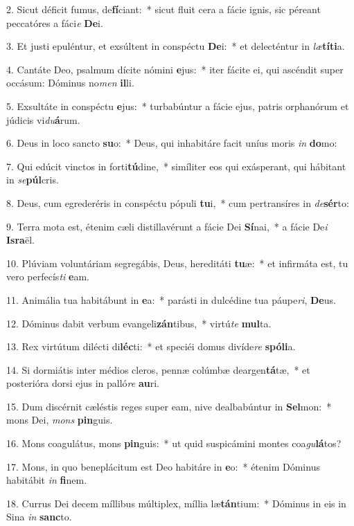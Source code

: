 2. Sicut déficit fumus, de\textbf{fí}ciant:~*  sicut fluit cera a fácie ignis, sic péreant peccatóres a fáci\textit{e} \textbf{De}i.\

3. Et justi epuléntur, et exsúltent in conspéctu \textbf{De}i:~*  et delecténtur in \textit{læ}\textbf{tí}\textbf{ti}a.\

4. Cantáte Deo, psalmum dícite nómini \textbf{e}jus:~*  iter fácite ei, qui ascéndit super occásum: Dóminus no\textit{men} \textbf{il}li.\

5. Exsultáte in conspéctu \textbf{e}jus:~*  turbabúntur a fácie ejus, patris orphanórum et júdicis vi\textit{du}\textbf{á}rum.\

6. Deus in loco sancto \textbf{su}o:~*  Deus, qui inhabitáre facit uníus moris \textit{in} \textbf{do}mo:\

7. Qui edúcit vinctos in forti\textbf{tú}dine,~*  simíliter eos qui exásperant, qui hábitant in \textit{se}\textbf{púl}cris.\

8. Deus, cum egrederéris in conspéctu pópuli \textbf{tu}i,~*  cum pertransíres in \textit{de}\textbf{sér}to:\

9. Terra mota est, étenim cæli distillavérunt a fácie Dei \textbf{Sí}nai,~*  a fácie De\textit{i} \textbf{Is}\textbf{ra}ël.\

10. Plúviam voluntáriam segregábis, Deus, hereditáti \textbf{tu}æ:~*  et infirmáta est, tu vero perfecís\textit{ti} \textbf{e}am.\

11. Animália tua habitábunt in \textbf{e}a:~*  parásti in dulcédine tua páupe\textit{ri}, \textbf{De}us.\

12. Dóminus dabit verbum evangeli\textbf{zán}tibus,~*  virtú\textit{te} \textbf{mul}ta.\

13. Rex virtútum dilécti di\textbf{léc}ti:~*  et speciéi domus divíde\textit{re} \textbf{spó}\textbf{li}a.\

14. Si dormiátis inter médios cleros, pennæ colúmbæ deargen\textbf{tá}tæ,~*  et posterióra dorsi ejus in palló\textit{re} \textbf{au}ri.\

15. Dum discérnit cæléstis reges super eam, nive dealbabúntur in \textbf{Sel}mon:~*  mons Dei, \textit{mons} \textbf{pin}guis.\

16. Mons coagulátus, mons \textbf{pin}guis:~*  ut quid suspicámini montes coa\textit{gu}\textbf{lá}tos?\

17. Mons, in quo beneplácitum est Deo habitáre in \textbf{e}o:~*  étenim Dóminus habitábit \textit{in} \textbf{fi}nem.\

18. Currus Dei decem míllibus múltiplex, míllia læ\textbf{tán}tium:~*  Dóminus in eis in Sina \textit{in} \textbf{sanc}to.\

